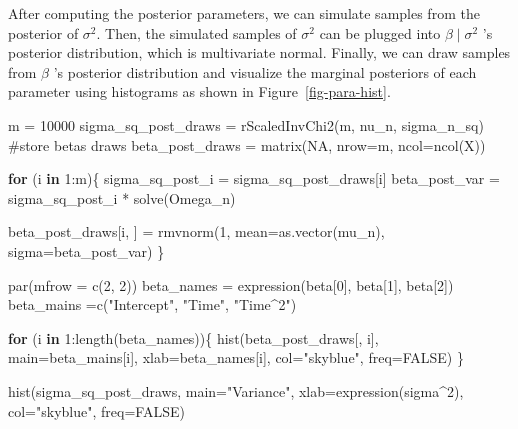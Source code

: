\documentclass[
  letterpaper,
  DIV=11,
  numbers=noendperiod]{scrartcl}
\newenvironment{Shaded}{\begin{snugshade}}{\end{snugshade}}
\newcommand{\AttributeTok}[1]{\textcolor[rgb]{0.40,0.45,0.13}{#1}}
\newcommand{\CommentTok}[1]{\textcolor[rgb]{0.37,0.37,0.37}{#1}}
\newcommand{\ConstantTok}[1]{\textcolor[rgb]{0.56,0.35,0.01}{#1}}
\newcommand{\ControlFlowTok}[1]{\textcolor[rgb]{0.00,0.23,0.31}{\textbf{#1}}}
\newcommand{\DecValTok}[1]{\textcolor[rgb]{0.68,0.00,0.00}{#1}}
\newcommand{\FunctionTok}[1]{\textcolor[rgb]{0.28,0.35,0.67}{#1}}
\newcommand{\NormalTok}[1]{\textcolor[rgb]{0.00,0.23,0.31}{#1}}
\newcommand{\OtherTok}[1]{\textcolor[rgb]{0.00,0.23,0.31}{#1}}
\newcommand{\SpecialCharTok}[1]{\textcolor[rgb]{0.37,0.37,0.37}{#1}}
\newcommand{\StringTok}[1]{\textcolor[rgb]{0.13,0.47,0.30}{#1}}
\begin{document}
After computing the posterior parameters, we can simulate samples from
the posterior of \(\sigma^2\). Then, the simulated samples of
\(\sigma^2\) can be plugged into \(\beta\mid\sigma^2\) 's posterior
distribution, which is multivariate normal. Finally, we can draw samples
from \(\beta\) 's posterior distribution and visualize the marginal
posteriors of each parameter using histograms as shown in
Figure~\ref{fig-para-hist}.

\begin{Shaded}
\begin{Highlighting}[]
\NormalTok{m }\OtherTok{=} \DecValTok{10000}
\NormalTok{sigma\_sq\_post\_draws }\OtherTok{=} \FunctionTok{rScaledInvChi2}\NormalTok{(m, nu\_n, sigma\_n\_sq)}
\CommentTok{\#store betas draws}
\NormalTok{beta\_post\_draws }\OtherTok{=} \FunctionTok{matrix}\NormalTok{(}\ConstantTok{NA}\NormalTok{, }\AttributeTok{nrow=}\NormalTok{m, }\AttributeTok{ncol=}\FunctionTok{ncol}\NormalTok{(X))}

\ControlFlowTok{for}\NormalTok{ (i }\ControlFlowTok{in} \DecValTok{1}\SpecialCharTok{:}\NormalTok{m)\{}
\NormalTok{  sigma\_sq\_post\_i }\OtherTok{=}\NormalTok{ sigma\_sq\_post\_draws[i]}
\NormalTok{  beta\_post\_var }\OtherTok{=}\NormalTok{ sigma\_sq\_post\_i }\SpecialCharTok{*} \FunctionTok{solve}\NormalTok{(Omega\_n)}
  
\NormalTok{  beta\_post\_draws[i, ] }\OtherTok{=} \FunctionTok{rmvnorm}\NormalTok{(}\DecValTok{1}\NormalTok{, }\AttributeTok{mean=}\FunctionTok{as.vector}\NormalTok{(mu\_n), }\AttributeTok{sigma=}\NormalTok{beta\_post\_var)}
\NormalTok{\}}

\FunctionTok{par}\NormalTok{(}\AttributeTok{mfrow =} \FunctionTok{c}\NormalTok{(}\DecValTok{2}\NormalTok{, }\DecValTok{2}\NormalTok{))}
\NormalTok{beta\_names }\OtherTok{=} \FunctionTok{expression}\NormalTok{(beta[}\DecValTok{0}\NormalTok{], beta[}\DecValTok{1}\NormalTok{], beta[}\DecValTok{2}\NormalTok{])}
\NormalTok{beta\_mains }\OtherTok{=}\FunctionTok{c}\NormalTok{(}\StringTok{"Intercept"}\NormalTok{, }\StringTok{"Time"}\NormalTok{, }\StringTok{"Time\^{}2"}\NormalTok{)}

\ControlFlowTok{for}\NormalTok{ (i }\ControlFlowTok{in} \DecValTok{1}\SpecialCharTok{:}\FunctionTok{length}\NormalTok{(beta\_names))\{}
  \FunctionTok{hist}\NormalTok{(beta\_post\_draws[, i], }\AttributeTok{main=}\NormalTok{beta\_mains[i], }\AttributeTok{xlab=}\NormalTok{beta\_names[i],}
       \AttributeTok{col=}\StringTok{"skyblue"}\NormalTok{,}
       \AttributeTok{freq=}\ConstantTok{FALSE}\NormalTok{)}
\NormalTok{\}}

\FunctionTok{hist}\NormalTok{(sigma\_sq\_post\_draws, }\AttributeTok{main=}\StringTok{"Variance"}\NormalTok{, }\AttributeTok{xlab=}\FunctionTok{expression}\NormalTok{(sigma}\SpecialCharTok{\^{}}\DecValTok{2}\NormalTok{), }\AttributeTok{col=}\StringTok{"skyblue"}\NormalTok{, }\AttributeTok{freq=}\ConstantTok{FALSE}\NormalTok{)}
\end{Highlighting}
\end{Shaded}
\end{document}
